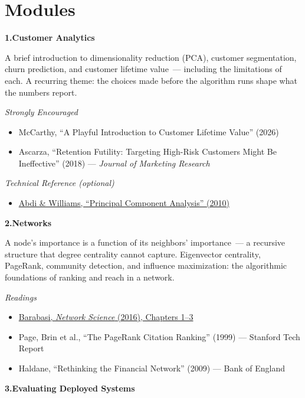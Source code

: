 \documentclass[11pt]{article}
\newcommand{\module}[2]{%
  \vspace{10pt}%
  {\large\textbf{#1\quad #2}}%
  \vspace{4pt}%
  \newline%
}
\begin{document}
\section*{Modules}

\module{1.}{Customer Analytics}

A brief introduction to dimensionality reduction (PCA), customer segmentation, churn prediction, and customer lifetime value~--- including the limitations of each. A recurring theme: the choices made before the algorithm runs shape what the numbers report.

\smallskip
\textit{Strongly Encouraged}
\begin{itemize}
  \item McCarthy, ``A Playful Introduction to Customer Lifetime Value'' (2026)
  \item Ascarza, ``Retention Futility: Targeting High-Risk Customers Might Be Ineffective'' (2018) --- \textit{Journal of Marketing Research}
\end{itemize}

\textit{Technical Reference (optional)}
\begin{itemize}
  \item \href{https://personal.utdallas.edu/~herve/abdi-awPCA2010.pdf}{Abdi \& Williams, ``Principal Component Analysis'' (2010)}
\end{itemize}

\bigskip

\module{2.}{Networks}

A node's importance is a function of its neighbors' importance~--- a recursive structure that degree centrality cannot capture. Eigenvector centrality, PageRank, community detection, and influence maximization: the algorithmic foundations of ranking and reach in a network.

\smallskip
\textit{Readings}
\begin{itemize}
  \item \href{http://networksciencebook.com}{Barabasi, \textit{Network Science} (2016), Chapters 1--3}
  \item Page, Brin et al., ``The PageRank Citation Ranking'' (1999) --- Stanford Tech Report
  \item Haldane, ``Rethinking the Financial Network'' (2009) --- Bank of England
\end{itemize}

\bigskip

\module{3.}{Evaluating Deployed Systems}
\end{document}
